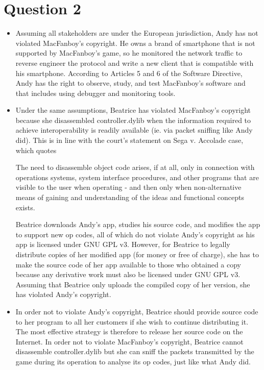 \documentclass[10pt,a4paper]{article}
\begin{document}
\section*{Question 2}
\begin{itemize}
\item Assuming all stakeholders are under the European jurisdiction, Andy has not violated MacFanboy's copyright. He owns a brand of smartphone that is not supported by MacFanboy's game, so he monitored the network traffic to reverse engineer the protocol and write a new client that is compatible with his smartphone. According to Articles 5 and 6 of the Software Directive, Andy has the right to observe, study, and test MacFanboy's software and that includes using debugger and monitoring tools.
\item Under the same assumptions, Beatrice has violated MacFanboy's copyright because she disassembled controller.dylib when the information required to achieve interoperability is readily available (ie. via packet sniffing like Andy did). This is in line with the court's statement on Sega v. Accolade case, which quotes

The need to disassemble object code arises, if at all, only in connection with operations systems, system interface procedures, and other programs that are visible to the user when operating - and then only when non-alternative means of gaining and understanding of the ideas and functional concepts exists.

Beatrice downloads Andy's app, studies his source code, and modifies the app to support new op codes, all of which do not violate Andy's copyright as his app is licensed under GNU GPL v3. However, for Beatrice to legally distribute copies of her modified app (for money or free of charge), she has to make the source code of her app available to those who obtained a copy because any derivative work must also be licensed under GNU GPL v3. Assuming that Beatrice only uploads the compiled copy of her version, she has violated Andy's copyright.
\item In order not to violate Andy's copyright, Beatrice should provide source code to her program to all her customers if she wish to continue distributing it. The most effective strategy is therefore to release her source code on the Internet. In order not to violate MacFanboy's copyright, Beatrice cannot disassemble controller.dylib but she can sniff the packets transmitted by the game during its operation to analyse its op codes, just like what Andy did.
\end{itemize}
\end{document}
